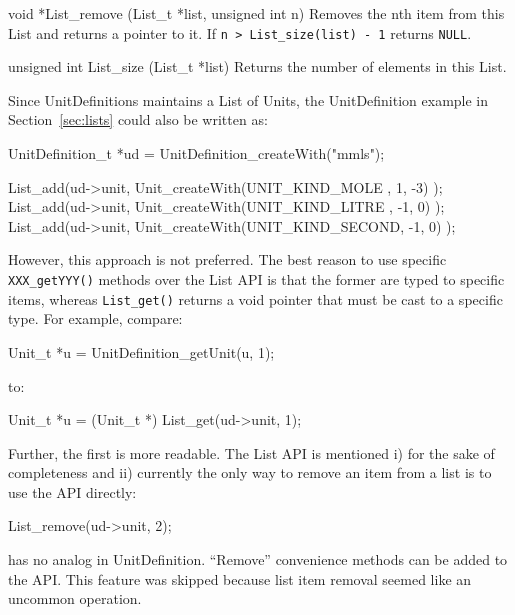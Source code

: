\documentclass{cekmanual}
\begin{document}
\begin{methoddef}{void *List\_remove (List\_t *list, unsigned int n)}
  Removes the nth item from this List and returns a pointer to it.  If
  \texttt{n > List\_size(list) - 1} returns \texttt{NULL}.
\end{methoddef}

\begin{methoddef}{unsigned int List\_size (List\_t *list)}
  Returns the number of elements in this List.
\end{methoddef}


Since UnitDefinitions maintains a List of Units, the UnitDefinition
example in Section~\ref{sec:lists} could also be written as:


\begin{example}
UnitDefinition_t *ud = UnitDefinition_createWith("mmls");

List_add(ud->unit, Unit_createWith(UNIT_KIND_MOLE  ,  1, -3) );
List_add(ud->unit, Unit_createWith(UNIT_KIND_LITRE , -1,  0) );
List_add(ud->unit, Unit_createWith(UNIT_KIND_SECOND, -1,  0) );
\end{example}


However, this approach is not preferred.  The best reason to use
specific \texttt{XXX\_getYYY()} methods over the List API is that the
former are typed to specific items, whereas \texttt{List\_get()}
returns a void pointer that must be cast to a specific type.  For
example, compare:

\begin{example}
Unit_t *u = UnitDefinition_getUnit(u, 1);
\end{example}

to:

\begin{example}
  Unit_t *u = (Unit_t *) List_get(ud->unit, 1);
\end{example}

Further, the first is more readable.  The List API is mentioned i) for
the sake of completeness and ii) currently the only way to remove an
item from a list is to use the API directly:

\begin{example}
List_remove(ud->unit, 2);
\end{example}

has no analog in UnitDefinition.  ``Remove'' convenience methods can be
added to the API.  This feature was skipped because list item removal
seemed like an uncommon operation.






\end{document}
